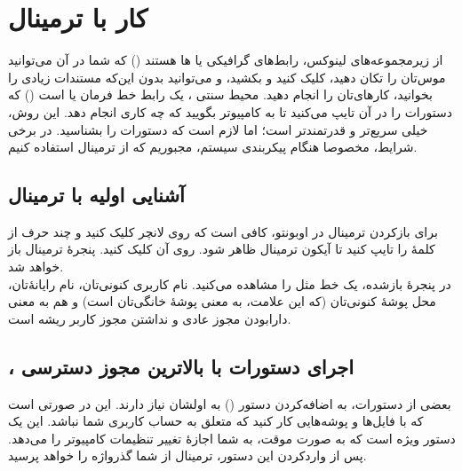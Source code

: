 \chapter{کار با ترمینال}
از زیرمجموعه‌های لینوکس، رابط‌های گرافیکی یا ها هستند () که شما در آن می‌توانید موس‌تان را تکان دهید، کلیک کنید و بکشید، و می‌توانید بدون این‌که مستندات زیادی را بخوانید، کارهای‌تان را انجام دهید. محیط سنتی ، یک رابط خط فرمان یا  است () که دستورات را در آن تایپ می‌کنید تا به کامپیوتر بگویید که چه کاری انجام دهد. این روش، خیلی سریع‌تر و قدرتمندتر است؛ اما لازم است که دستورات را بشناسید. در برخی شرایط، مخصوصا هنگام پیکربندی سیستم، مجبوریم که از ترمینال استفاده کنیم.

\section{آشنایی اولیه با ترمینال}
برای بازکردن ترمینال در اوبونتو، کافی است که روی لانچر کلیک کنید و چند حرف از کلمهٔ  را تایپ کنید تا آیکون ترمینال ظاهر شود. روی آن کلیک کنید. پنجرهٔ ترمینال باز خواهد شد.\\
در پنجرهٔ بازشده، یک خط مثل  را مشاهده می‌کنید.  نام کاربری کنونی‌تان،  نام رایانهٔ‌تان، \lr{\texttt{$\sim$}} محل پوشهٔ کنونی‌تان (که این علامت، به معنی پوشهٔ خانگی‌تان است) و \lr{\texttt{\$}} هم به معنی دارابودن مجوز عادی و نداشتن مجوز کاربر ریشه است.\\

\section[،sudo اجرای دستورات با بالاترین مجوز دسترسی]{، اجرای دستورات با بالاترین مجوز دسترسی}
بعضی از دستورات، به اضافه‌کردن دستور  () به اولشان نیاز دارند. این در صورتی است که با فایل‌ها و پوشه‌هایی کار کنید که متعلق به حساب کاربری شما نباشد. این یک دستور ویژه است که به صورت موقت، به شما اجازهٔ تغییر تنظیمات کامپیوتر را می‌دهد. پس از واردکردن این دستور، ترمینال از شما گذرواژه را خواهد پرسید.

